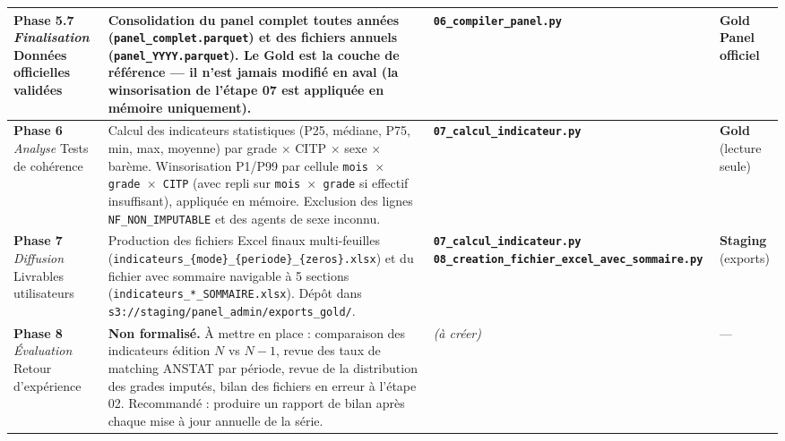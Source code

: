 \documentclass[12pt,a4paper,french]{report}
\newcommand{\scriptname}[1]{\texttt{\textbf{#1}}}
\newcommand{\bucket}[1]{\texttt{s3://#1}}
\begin{document}
\begin{longtable}{p{3.2cm} p{5.5cm} p{4cm} p{2cm}}
  \midrule

  \textbf{Phase 5.7}
  \newline \textit{Finalisation}
  \newline \small{Données officielles validées}
  &
  Consolidation du panel complet toutes années (\texttt{panel\_complet.parquet})
  et des fichiers annuels (\texttt{panel\_YYYY.parquet}).
  Le Gold est la couche de référence — il n'est jamais modifié en aval
  (la winsorisation de l'étape 07 est appliquée en mémoire uniquement).
  &
  \scriptname{06\_compiler\_panel.py}
  &
  \textbf{Gold}
  \newline Panel officiel \\

  \midrule

  \textbf{Phase 6}
  \newline \textit{Analyse}
  \newline \small{Tests de cohérence}
  &
  Calcul des indicateurs statistiques (P25, médiane, P75, min, max, moyenne)
  par grade $\times$ CITP $\times$ sexe $\times$ barème. Winsorisation
  P1/P99 par cellule \texttt{mois $\times$ grade $\times$ CITP} (avec repli sur
  \texttt{mois $\times$ grade} si effectif insuffisant), appliquée en mémoire.
  Exclusion des lignes \texttt{NF\_NON\_IMPUTABLE} et des agents de sexe inconnu.
  &
  \scriptname{07\_calcul\_indicateur.py}
  &
  \textbf{Gold}
  \newline (lecture seule) \\

  \midrule

  \textbf{Phase 7}
  \newline \textit{Diffusion}
  \newline \small{Livrables utilisateurs}
  &
  Production des fichiers Excel finaux multi-feuilles
  (\texttt{indicateurs\_\{mode\}\_\{periode\}\_\{zeros\}.xlsx}) et du fichier avec
  sommaire navigable à 5 sections (\texttt{indicateurs\_*\_SOMMAIRE.xlsx}).
  Dépôt dans \bucket{staging/panel\_admin/exports\_gold/}.
  &
  \scriptname{07\_calcul\_indicateur.py}
  \newline \scriptname{08\_creation\_fichier\_excel\_avec\_sommaire.py}
  &
  \textbf{Staging}
  \newline (exports) \\

  \midrule

  \textbf{Phase 8}
  \newline \textit{Évaluation}
  \newline \small{Retour d'expérience}
  &
  \textcolor{warningorange}{\textbf{Non formalisé.}}
  À mettre en place : comparaison des indicateurs édition $N$ vs $N-1$,
  revue des taux de matching ANSTAT par période, revue de la distribution des
  grades imputés, bilan des fichiers en erreur à l'étape 02. Recommandé :
  produire un rapport de bilan après chaque mise à jour annuelle de la série.
  &
  \textit{(à créer)}
  &
  — \\

  \bottomrule
\end{longtable}
\endgroup
\end{document}
